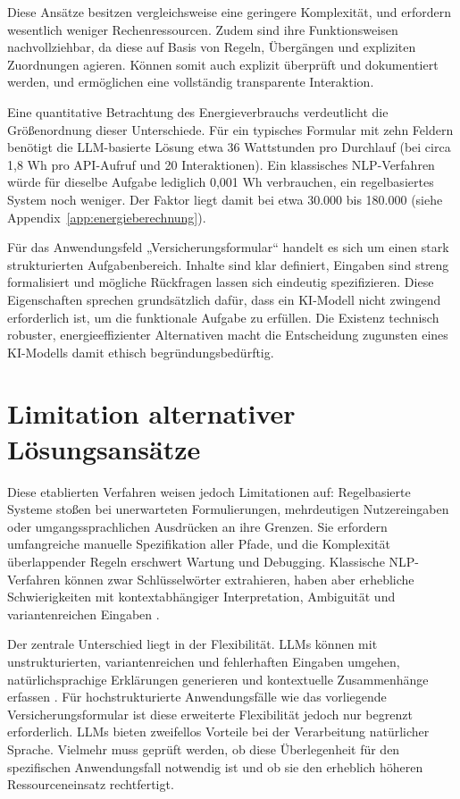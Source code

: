 Diese Ansätze besitzen vergleichsweise eine geringere Komplexität, und erfordern wesentlich weniger Rechenressourcen. Zudem sind ihre Funktionsweisen nachvollziehbar, da diese auf Basis von Regeln, Übergängen und expliziten Zuordnungen agieren. Können somit auch explizit überprüft und dokumentiert werden, und ermöglichen eine vollständig transparente Interaktion.

Eine quantitative Betrachtung des Energieverbrauchs verdeutlicht die Größenordnung dieser Unterschiede. Für ein typisches Formular mit zehn Feldern benötigt die LLM-basierte Lösung etwa 36 Wattstunden pro Durchlauf (bei circa 1,8 Wh pro API-Aufruf und 20 Interaktionen). Ein klassisches NLP-Verfahren würde für dieselbe Aufgabe lediglich 0,001 Wh verbrauchen, ein regelbasiertes System noch weniger. Der Faktor liegt damit bei etwa 30.000 bis 180.000 \cite[vgl.]{strubellEnergyPolicyConsiderations2019,zschacheComparingEnergyConsumption2025} (siehe Appendix~\ref{app:energieberechnung}).

Für das Anwendungsfeld „Versicherungsformular“ handelt es sich um einen stark strukturierten Aufgabenbereich. Inhalte sind klar definiert, Eingaben sind streng formalisiert und mögliche Rückfragen lassen sich eindeutig spezifizieren. Diese Eigenschaften sprechen grundsätzlich dafür, dass ein KI-Modell nicht zwingend erforderlich ist, um die funktionale Aufgabe zu erfüllen. Die Existenz technisch robuster, energieeffizienter Alternativen macht die Entscheidung zugunsten eines KI-Modells damit ethisch begründungsbedürftig.

\section{Limitation alternativer Lösungsansätze}

Diese etablierten Verfahren weisen jedoch Limitationen auf: Regelbasierte Systeme stoßen bei unerwarteten Formulierungen, mehrdeutigen Nutzereingaben oder umgangssprachlichen Ausdrücken an ihre Grenzen. Sie erfordern umfangreiche manuelle Spezifikation aller Pfade, und die Komplexität überlappender Regeln erschwert Wartung und Debugging. Klassische NLP-Verfahren können zwar Schlüsselwörter extrahieren, haben aber erhebliche Schwierigkeiten mit kontextabhängiger Interpretation, Ambiguität und variantenreichen Eingaben \cite{xNLUChallengesAmbiguity2024}.

Der zentrale Unterschied liegt in der Flexibilität. LLMs können mit unstrukturierten, variantenreichen und fehlerhaften Eingaben umgehen, natürlichsprachige Erklärungen generieren und kontextuelle Zusammenhänge erfassen \cite{zschacheComparingEnergyConsumption2025}. Für hochstrukturierte Anwendungsfälle wie das vorliegende Versicherungsformular ist diese erweiterte Flexibilität jedoch nur begrenzt erforderlich. LLMs bieten zweifellos Vorteile bei der Verarbeitung natürlicher Sprache. Vielmehr muss geprüft werden, ob diese Überlegenheit für den spezifischen Anwendungsfall notwendig ist und ob sie den erheblich höheren Ressourceneinsatz rechtfertigt.

